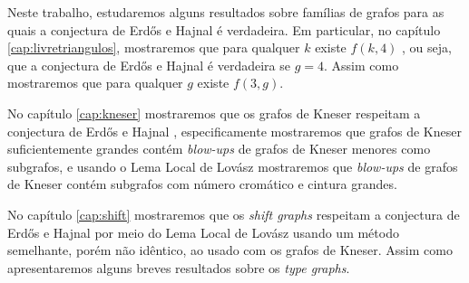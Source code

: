 Neste trabalho, estudaremos alguns resultados sobre famílias de grafos para as quais a conjectura de Erd\H{o}s e Hajnal é verdadeira. Em particular, no capítulo \ref{cap:livretriangulos}, mostraremos que para qualquer $k$ existe $f(k,4)$ \cite{rodl1977chromatic}, ou seja, que a conjectura de Erd\H{o}s e Hajnal é verdadeira se $g=4$. Assim como mostraremos que para qualquer $g$ existe $f(3,g)$.

No capítulo \ref{cap:kneser} mostraremos que os grafos de Kneser respeitam a conjectura de Erd\H{o}s e Hajnal \cite{mohar2015triangle}, especificamente mostraremos que grafos de Kneser suficientemente grandes contém \textit{blow-ups} de grafos de Kneser menores como subgrafos, e usando o Lema Local de Lovász mostraremos que \textit{blow-ups} de grafos de Kneser contém subgrafos com número cromático e cintura grandes.

No capítulo \ref{cap:shift} mostraremos que os \textit{shift graphs} respeitam a conjectura de Erd\H{o}s e Hajnal \cite{gabor2018cepa} por meio do Lema Local de Lovász usando um método semelhante, porém não idêntico, ao usado com os grafos de Kneser. Assim como apresentaremos alguns breves resultados sobre os \textit{type graphs}. %